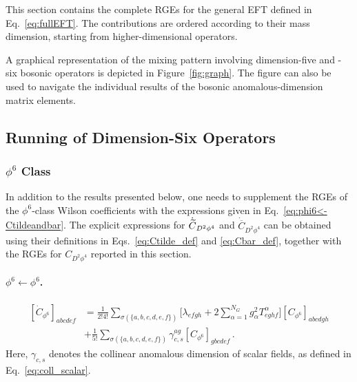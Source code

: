 This section contains the complete RGEs for the general EFT defined in Eq.~\eqref{eq:fullEFT}.
The contributions are ordered according to their mass dimension, starting from higher-dimensional operators.

A graphical representation of the mixing pattern involving dimension-five and -six bosonic operators is depicted in Figure~\ref{fig:graph}. 
The figure can also be used to navigate the individual results of the bosonic anomalous-dimension matrix elements.

\subsection{Running of Dimension-Six Operators}

\subsubsection{\texorpdfstring{$\phi^6$}{phi6} Class}


In addition to the results presented below, one needs to supplement the RGEs of the $\phi^6$-class Wilson coefficients with the expressions given in Eq.~\eqref{eq:phi6<-Ctildeandbar}.
The explicit expressions for $\dot{\widetilde{C}}_{D^2\phi^4}$ and $\dot{\overline C}_{D^2\phi^4}$ can be obtained using their definitions in Eqs.~\eqref{eq:Ctilde_def} and \eqref{eq:Cbar_def}, together with the RGEs for $C_{D^2\phi^4}$ reported in this section.

\paragraph{\texorpdfstring{$\phi^6 \leftarrow \phi^6$}{phi6fromphi6}.}
\label{par:phi6<-phi6}

\begin{align}
    \left[\dot C_{\phi^6}\right]_{abcdef} &= \frac{1}{2!4!}\sum_{\sigma(\{a,b,c,d,e,f\})}\bigg[\lambda_{efgh}+2\sum_{\alpha=1}^{N_G} g_\alpha^2 T^\alpha_{eghf}\bigg]\left[ C_{\phi^6}\right]_{abcdgh}\nonumber \\
    & +\frac{1}{5!}\sum_{\sigma(\{a,b,c,d,e,f\})} \gamma_{c,s}^{ag}\left[ C_{\phi^6}\right]_{gbcdef}
    \label{eq:phi6<-phi6}\,.
\end{align}
Here, $\gamma_{c,s}$ denotes the collinear anomalous dimension of scalar fields, as defined in Eq.~\eqref{eq:coll_scalar}.

